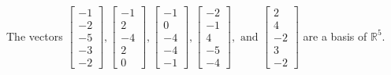 \begin{exercise}
\begin{exerciseStatement}
  \end{exerciseStatement}
  \begin{exerciseAnswer}
   The vectors \(\left[\begin{array}{r}
-1 \\
-2 \\
-5 \\
-3 \\
-2
\end{array}\right] , \left[\begin{array}{r}
-1 \\
2 \\
-4 \\
2 \\
0
\end{array}\right] , \left[\begin{array}{r}
-1 \\
0 \\
-4 \\
-4 \\
-1
\end{array}\right] , \left[\begin{array}{r}
-2 \\
-1 \\
4 \\
-5 \\
-4
\end{array}\right] , \text{ and } \left[\begin{array}{r}
2 \\
4 \\
-2 \\
3 \\
-2
\end{array}\right]\) 
  	 are  a basis of \(\mathbb{R}^5\).
  


  \end{exerciseAnswer}
\end{exercise}